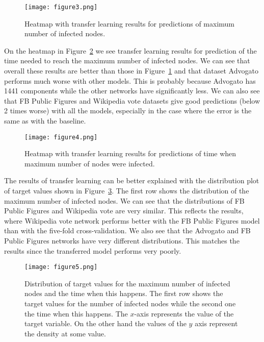 \documentclass{article}
\begin{document}
\begin{figure}[t]
  \centering
  \texttt{[image: figure3.png]}
  \caption{Heatmap with transfer learning results for predictions of maximum number of infected nodes.}
  \label{fig:transfer-score}
\end{figure}

On the heatmap in Figure~\ref{fig:transfer-time} we see transfer learning results for prediction of the time needed to reach the maximum number of infected nodes. We can see that overall these results are better than those in Figure~\ref{fig:transfer-score} and that dataset Advogato performs much worse with other models. This is probably because Advogato has 1441 components while the other networks have significantly less. We can also see that FB Public Figures and Wikipedia vote datasets give good predictions (below 2 times worse) with all the models, especially in the case where the error is the same as with the baseline.

\begin{figure}[t]
  \centering
  \texttt{[image: figure4.png]}
  \caption{Heatmap with transfer learning results for predictions of time when maximum number of nodes were infected.}
  \label{fig:transfer-time}
\end{figure}

The results of transfer learning can be better explained with the distribution plot of target values shown in Figure~\ref{fig:distribution}. The first row shows the distribution of the maximum number of infected nodes. We can see that the distributions of FB Public Figures and Wikipedia vote are very similar. This reflects the results, where Wikipedia vote network performs better with the FB Public Figures model than with the five-fold cross-validation. We also see that the Advogato and FB Public Figures networks have very different distributions. This matches the results since the transferred model performs very poorly.

\begin{figure}[t!]
  \centering
  \texttt{[image: figure5.png]}
  \caption{Distribution of target values for the maximum number of infected nodes and the time when this happens. The first row shows the target values for the number of infected nodes while the second one the time when this happens. The $x$-axis represents the value of the target variable. On the other hand the values of the $y$ axis represent the density at some value.}
  \label{fig:distribution}
\end{figure}
\end{document}
